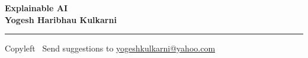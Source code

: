 
\graphicspath{{images/}}

\footnotesize


\begin{center}
\Large{\textbf{Explainable AI\\ Yogesh Haribhau Kulkarni}}  
\end{center}

\begin{multicols}{2}
% 

\end{multicols}

\rule{\linewidth}{0.25pt}
\scriptsize
Copyleft \textcopyleft\  Send suggestions to 
\href{http://yati.io}{yogeshkulkarni@yahoo.com}


